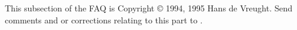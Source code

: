 This subsection of the FAQ is Copyright © 1994, 1995 Hans de Vreught.
Send comments and or corrections relating to this part to \emailhans.
